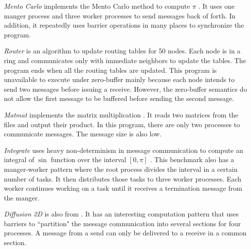 \begin{compactitem}
\item \textit{Mento Carlo} implements the Mento Carlo method to compute $\pi$ \cite{}. It uses one manger process and three worker processes to send messages back of forth. In addition, it repeatedly uses barrier operations in many places to synchronize the program. 
\item \textit{Router} is an algorithm to update routing tables \cite{} for 50 nodes. Each node is in a ring and communicates only with immediate neighbors to update the tables. The program ends when all the routing tables are updated. This program is unavailable to execute under zero-buffer mainly because each node intends to send two messages before issuing a receive. However, the zero-buffer semantics do not allow the first message to be buffered before sending the second message.
\item \textit{Matmat} implements the matrix multiplication \cite{}. It reads two matrices from the files and output their product. In this program, there are only two processes to communicate messages. The message size is also low.
\item \textit{Integrate} uses heavy non-determinism in message communication to compute an integral of $\sin$ function over the interval $[0, \pi]$ \cite{}. This benchmark also has a manger-worker pattern where the root process divides the interval in a certain number of tasks. It then distributes those tasks to three worker processes. Each worker continues working on a task until it receives a termination message from the manger.
\item \textit{Diffusion 2D} is also from \cite{}. It has an interesting computation pattern that uses barriers to ``partition" the message communication into several sections for four processes. A message from a send can only be delivered to a receive in a common section. 

\end{compactitem}

